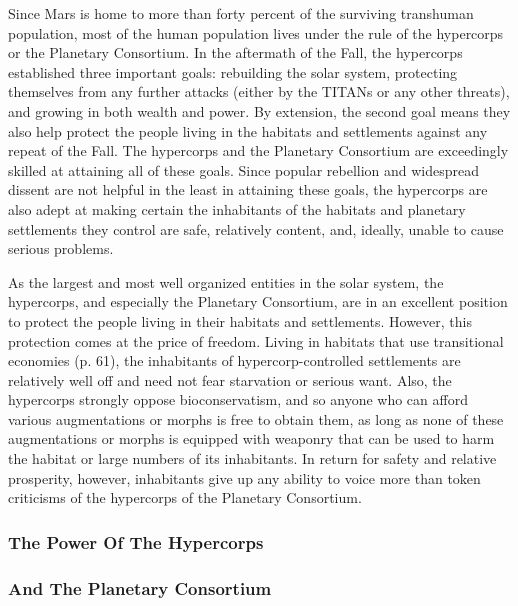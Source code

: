 Since Mars is home to more than forty percent of 
the surviving transhuman population, most of the 
human population lives under the rule of the hypercorps or the Planetary Consortium. In the aftermath 
of the Fall, the hypercorps established three important 
goals: rebuilding the solar system, protecting themselves from any further attacks (either by the TITANs 
or any other threats), and growing in both wealth 
and power. By extension, the second goal means they 
also help protect the people living in the habitats and 
settlements against any repeat of the Fall. The hypercorps and the Planetary Consortium are exceedingly 
skilled at attaining all of these goals. Since popular 
rebellion and widespread dissent are not helpful in 
the least in attaining these goals, the hypercorps are 
also adept at making certain the inhabitants of the 
habitats and planetary settlements they control are 
safe, relatively content, and, ideally, unable to cause 
serious problems.

As the largest and most well organized entities in 
the solar system, the hypercorps, and especially the 
Planetary Consortium, are in an excellent position to 
protect the people living in their habitats and settlements. However, this protection comes at the price 
of freedom. Living in habitats that use transitional 
economies (p. 61), the inhabitants of hypercorp-controlled settlements are relatively well off and need not 
fear starvation or serious want. Also, the hypercorps 
strongly oppose bioconservatism, and so anyone who 
can afford various augmentations or morphs is free 
to obtain them, as long as none of these augmentations or morphs is equipped with weaponry that can 
be used to harm the habitat or large numbers of its 
inhabitants. In return for safety and relative prosperity, however, inhabitants give up any ability to voice 
more than token criticisms of the hypercorps of the 
Planetary Consortium.

\subsubsection{The Power Of The Hypercorps}


\subsubsection{And The Planetary Consortium}

